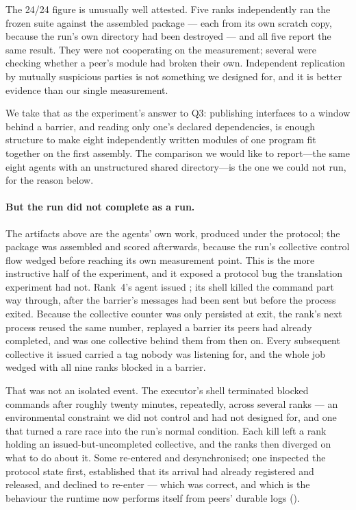 The 24/24 figure is unusually well attested. Five ranks independently ran
the frozen suite against the assembled package --- each from its own scratch
copy, because the run's own  directory had been destroyed ---
and all five report the same result. They were not cooperating on the
measurement; several were checking whether a peer's module had broken their
own. Independent replication by mutually suspicious parties is not something
we designed for, and it is better evidence than our single measurement.

We take that as the experiment's answer to Q3: publishing interfaces to a
window behind a barrier, and reading only one's declared dependencies, is
enough structure to make eight independently written modules of one program
fit together on the first assembly. The comparison we would like to
report---the same eight agents with an unstructured shared directory---is
the one we could not run, for the reason below.

\paragraph{But the run did not complete as a run.} The artifacts above are
the agents' own work, produced under the protocol; the package was assembled
and scored afterwards, because the run's collective control flow wedged
before reaching its own measurement point. This is the more instructive half
of the experiment, and it exposed a protocol bug the translation experiment
had not. Rank~4's agent issued
; its shell killed the command part way through, after
the barrier's messages had been sent but before the process exited. Because
the collective counter was only persisted at exit, the rank's next process
reused the same number, replayed a barrier its peers had already completed,
and was one collective behind them from then on. Every subsequent collective
it issued carried a tag nobody was listening for, and the whole job wedged
with all nine ranks blocked in a barrier.

That was not an isolated event. The executor's shell terminated blocked
 commands after roughly twenty minutes, repeatedly, across
several ranks --- an environmental constraint we did not control and had not
designed for, and one that turned a rare race into the run's normal
condition. Each kill left a rank holding an issued-but-uncompleted
collective, and the ranks then diverged on what to do about it. Some
re-entered and desynchronised; one inspected the protocol state first,
established that its arrival had already registered and released, and
declined to re-enter --- which was correct, and which is the behaviour the
runtime now performs itself from peers' durable logs
().

